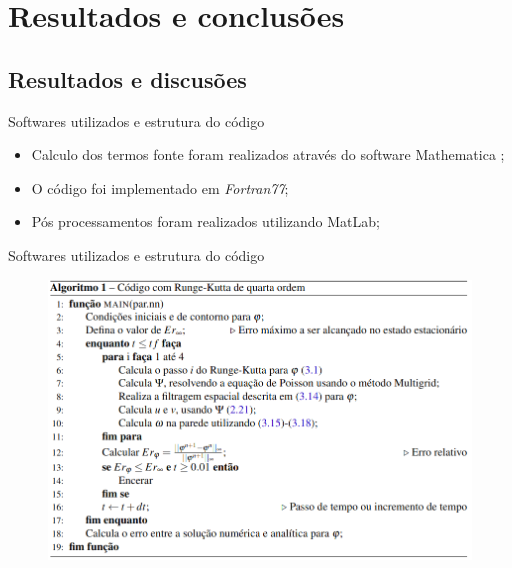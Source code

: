 \section{Resultados e conclusões}

\subsection{Resultados e discusões}

\begin{frame}{Softwares utilizados e estrutura do código}
\begin{itemize}
    \item Calculo dos termos fonte foram realizados através do software Mathematica \cite{Mathematica};
    \item O código foi implementado em \textit{Fortran77};
    \item Pós processamentos foram realizados utilizando MatLab; 
\end{itemize}
\end{frame}

\begin{frame}{Softwares utilizados e estrutura do código}
\begin{figure}[htb]
 \centering
 \includegraphics[scale=0.55]{Figures/pseudo.png}
 \caption*{}
\end{figure}
\end{frame}

